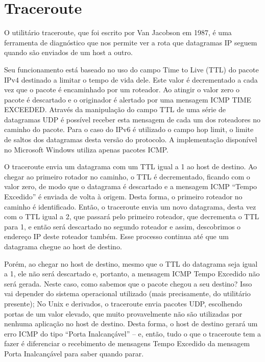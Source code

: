 \chapter{Traceroute}

O utilitário traceroute, que foi escrito por Van Jacobson em 1987, é uma
ferramenta de diagnóstico que nos permite ver a rota que datagramas IP seguem
 quando são enviados de um host a outro.

Seu funcionamento está baseado no uso do campo Time to Live (TTL) do pacote IPv4
destinado a limitar o tempo de vida dele. Este valor é decrementado a cada vez
que o pacote é encaminhado por um roteador. Ao atingir o valor zero o pacote é
descartado e o originador é alertado por uma mensagem ICMP TIME EXCEEDED.
Através da manipulação do campo TTL de uma série de datagramas UDP é possível
receber esta mensagem de cada um dos roteadores no caminho do pacote. Para
o caso do IPv6 é utilizado o campo hop limit, o limite de saltos dos
datagramas desta versão do protocolo. A implementação disponível no
Microsoft Windows utiliza apenas pacotes ICMP.

O traceroute envia um datagrama com um TTL igual a 1 ao host de destino.
Ao chegar ao primeiro rotador no caminho, o TTL é decrementado, ficando
com o valor zero, de modo que o datagrama é descartado e a mensagem ICMP
“Tempo Excedido” é enviada de volta à origem. Desta forma, o primeiro roteador
no caminho é identificado. Então, o traceroute envia um novo datagrama, desta
vez com o TTL igual a 2, que passará pelo primeiro roteador, que decrementa o
TTL para 1, e então será descartado no segundo roteador e assim, descobrimos
o endereço IP deste roteador também. Esse processo continua até que um datagrama
 chegue ao host de destino.


Porém, ao chegar no host de destino, mesmo que o TTL do datagrama seja igual a 1,
ele não será descartado e, portanto, a mensagem ICMP Tempo Excedido não será gerada.
Neste caso, como sabemos que o pacote chegou a seu destino? Isso vai depender do
sistema operacional utilizado (mais precisamente, do utilitário presente); No Unix
e derivados, o traceroute envia pacotes UDP, escolhendo portas de um valor elevado,
que muito provavelmente não são utilizadas por nenhuma aplicação no host de destino.
Desta forma, o host de destino gerará um erro ICMP do tipo “Porta Inalcançável” – e,
então, tudo o que o traceroute tem a fazer é diferenciar o recebimento de mensagens
Tempo Excedido da mensagem Porta Inalcançável para saber quando parar.

